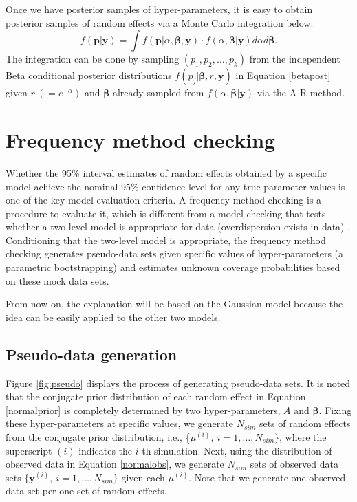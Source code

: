 \documentclass[article]{jss}
\begin{document}
Once we have posterior samples of hyper-parameters, it is easy to obtain posterior samples of random effects via a Monte Carlo integration below.
\begin{equation}\label{mcintegration}
f(\boldsymbol{p}\vert \boldsymbol{y})=\int  f(\boldsymbol{p}\vert \alpha, \boldsymbol{\beta}, \boldsymbol{y})\cdot f(\alpha, \boldsymbol{\beta}\vert \boldsymbol{y})d\alpha d\boldsymbol{\beta}.
\end{equation}
The integration can be done by sampling $(p_1, p_2, \ldots, p_k)$ from the independent Beta conditional posterior distributions $f(p_j\vert \boldsymbol{\beta}, r, \boldsymbol{y})$ in Equation \ref{betapost}  given $r~(=e^{-\alpha})$ and $\boldsymbol{\beta}$ already sampled from $f(\alpha, \boldsymbol{\beta}\vert \boldsymbol{y})$ via the A-R method. 




\section{Frequency method checking}\label{sec4}
Whether the 95\%  interval estimates of random effects obtained by a specific model achieve the nominal 95\% confidence level  for any true parameter values is one of the key model evaluation criteria. A frequency method checking is a procedure to evaluate it, which is different from a model checking that tests whether a two-level model is appropriate for data (overdispersion exists in data) \citep{dean1992testing, modelchecking1996}.   Conditioning that the two-level model is appropriate, the frequency method checking   generates pseudo-data sets given specific values of hyper-parameters (a parametric bootstrapping) and estimates unknown coverage probabilities based on these mock data sets.


From now on, the explanation will be based on the Gaussian model because the idea can be easily applied to the other two models.




\subsection{Pseudo-data generation}\label{data_generation}
Figure \ref{fig:pseudo} displays the process of generating pseudo-data sets. It is noted that  the conjugate prior distribution of each random effect in Equation \ref{normalprior} is completely determined by two hyper-parameters, $A$ and $\boldsymbol{\beta}$. Fixing these hyper-parameters at specific values, we generate  $N_{sim}$ sets of random effects from the conjugate prior distribution, i.e., \{{\boldmath $\mu$}$^{(i)},~i=1, \ldots, N_{sim}\}$, where the superscript $(i)$ indicates the $i$-th simulation. Next, using the distribution of observed data in Equation \ref{normalobs}, we generate $N_{sim}$ sets of observed data sets $\{\boldsymbol{y}^{(i)},~i=1, \ldots, N_{sim}\}$ given each {\boldmath$\mu$}$^{(i)}$. Note that we generate one observed data set per one set of random effects.
\end{document}
